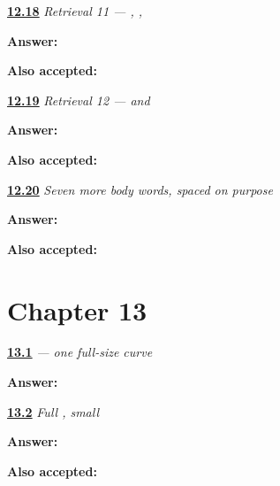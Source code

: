 \noindent\begin{minipage}[t]{\linewidth}
\raggedright
\hyperlink{review-JA-R12-writing-02-card}{\textbf{12.18}} \emph{Retrieval 11 — , , }\par
\small \textbf{Answer:} \par
\footnotesize \textbf{Also accepted:}   
\end{minipage}\par\medskip

\noindent\begin{minipage}[t]{\linewidth}
\raggedright
\hyperlink{review-JA-R12-body-01-card}{\textbf{12.19}} \emph{Retrieval 12 —  and }\par
\small \textbf{Answer:} \par
\footnotesize \textbf{Also accepted:}  
\end{minipage}\par\medskip

\noindent\begin{minipage}[t]{\linewidth}
\raggedright
\hyperlink{review-JA-C12-body-map-two-dictation}{\textbf{12.20}} \emph{Seven more body words, spaced on purpose}\par
\small \textbf{Answer:} \par
\footnotesize \textbf{Also accepted:}       
\end{minipage}\par\medskip

\section*{Chapter 13}

\noindent\begin{minipage}[t]{\linewidth}
\raggedright
\hyperlink{review-JA-W13-tsu-write}{\textbf{13.1}} \emph{ — one full-size curve}\par
\small \textbf{Answer:} \par
\end{minipage}\par\medskip

\noindent\begin{minipage}[t]{\linewidth}
\raggedright
\hyperlink{review-JA-R13-tsu-contrast-recall}{\textbf{13.2}} \emph{Full , small }\par
\small \textbf{Answer:} \par
\footnotesize \textbf{Also accepted:}  
\end{minipage}\par\medskip

